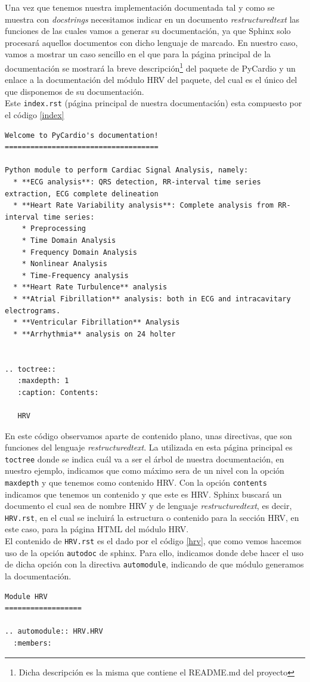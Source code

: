 Una vez que tenemos nuestra implementación documentada tal y como se muestra con \textit{docstrings} necesitamos indicar en un documento \textit{restructuredtext} las funciones de las cuales vamos a generar su documentación, ya que Sphinx solo procesará aquellos documentos con dicho lenguaje de marcado. En nuestro caso, vamos a mostrar un caso sencillo en el que para la página principal de la documentación se mostrará la breve descripción\footnote{Dicha descripción es la misma que contiene el README.md del proyecto} del paquete de PyCardio y un enlace a la documentación del módulo HRV del paquete, del cual es el único del que disponemos de su documentación. \\
Este \texttt{index.rst} (página principal de nuestra documentación) esta compuesto por el código \ref{index}
\begin{lstlisting}[caption=\texttt{index.rst},label=index]
Welcome to PyCardio's documentation!
====================================

Python module to perform Cardiac Signal Analysis, namely:
  * **ECG analysis**: QRS detection, RR-interval time series extraction, ECG complete delineation
  * **Heart Rate Variability analysis**: Complete analysis from RR-interval time series:
    * Preprocessing
    * Time Domain Analysis
    * Frequency Domain Analysis
    * Nonlinear Analysis
    * Time-Frequency analysis
  * **Heart Rate Turbulence** analysis
  * **Atrial Fibrillation** analysis: both in ECG and intracavitary electrograms.
  * **Ventricular Fibrillation** Analysis
  * **Arrhythmia** analysis on 24 holter


.. toctree::
   :maxdepth: 1
   :caption: Contents:

   HRV

\end{lstlisting}
En este código observamos aparte de contenido plano, unas directivas, que son funciones del lenguaje \textit{restructuredtext}. La utilizada en esta página principal es \texttt{toctree} donde se indica cuál va a ser el árbol de nuestra documentación, en nuestro ejemplo, indicamos que como máximo sera de un nivel con la opción \texttt{maxdepth} y que tenemos como contenido HRV. Con la opción \texttt{contents}  indicamos que tenemos un contenido y que este es HRV. Sphinx buscará un documento el cual sea de nombre HRV y de lenguaje \textit{restructuredtext}, es decir, \texttt{HRV.rst}, en el cual se incluirá la estructura o contenido para la sección HRV, en este caso, para la página HTML del módulo HRV. \\
El contenido de \texttt{HRV.rst} es el dado por el código \ref{hrv}, que como vemos hacemos uso de la opción \texttt{autodoc} de sphinx. Para ello, indicamos donde debe hacer el uso de dicha opción con la directiva \texttt{automodule}, indicando de que módulo generamos la documentación. \begin{lstlisting}[caption=\texttt{HRV.rst},label=hrv]
Module HRV
==================

.. automodule:: HRV.HRV
  :members:

\end{lstlisting}

